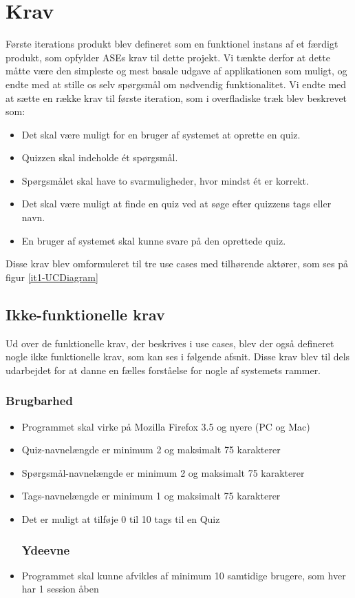 \section{Krav}
Første iterations produkt blev defineret som en funktionel instans af et færdigt produkt, som opfylder ASEs krav til dette projekt. Vi tænkte derfor at dette måtte være den simpleste og mest basale udgave af applikationen som muligt, og endte med at stille os selv spørgsmål om nødvendig funktionalitet.
Vi endte med at sætte en række krav til første iteration, som i overfladiske træk blev beskrevet som:
\begin{itemize}
	\item Det skal være muligt for en bruger af systemet at oprette en quiz.
	\item Quizzen skal indeholde ét spørgsmål.
	\item Spørgsmålet skal have to svarmuligheder, hvor mindst ét er korrekt.
	\item Det skal være muligt at finde en quiz ved at søge efter quizzens tags eller navn.
	\item En bruger af systemet skal kunne svare på den oprettede quiz.
\end{itemize}

Disse krav blev omformuleret til tre use cases med tilhørende aktører, som ses på figur \ref{it1-UCDiagram}


\subsection*{Ikke-funktionelle krav}
Ud over de funktionelle krav, der beskrives i use cases, blev der også defineret nogle ikke funktionelle krav, som kan ses i følgende afsnit. Disse krav blev til dels udarbejdet for at danne en fælles forståelse for nogle af systemets rammer.

\subsubsection*{Brugbarhed}
\begin{itemize}
	\item Programmet skal virke på Mozilla Firefox 3.5 og nyere (PC og Mac)
	\item Quiz-navnelængde er minimum 2 og maksimalt 75 karakterer
	\item Spørgsmål-navnelængde er minimum 2 og maksimalt 75 karakterer
	\item Tags-navnelængde er minimum 1 og maksimalt 75 karakterer
	\item Det er muligt at tilføje 0 til 10 tags til en Quiz

\subsubsection*{Ydeevne}
	\item Programmet skal kunne afvikles af minimum 10 samtidige brugere, som hver har 1 session åben

\end{itemize}